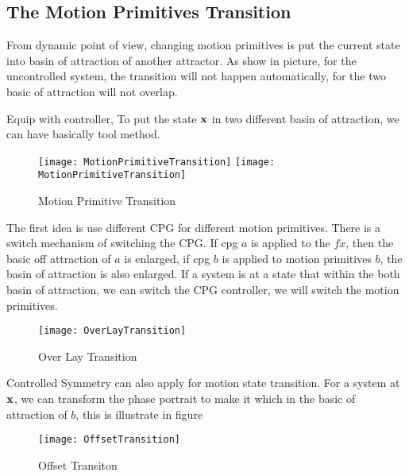 \subsection{The Motion Primitives Transition}

From dynamic point of view, changing motion primitives is put the current state into basin of attraction of another attractor.
As show in picture, for the uncontrolled system, the transition will not happen automatically, for the two basic of attraction will not overlap.

Equip with controller,
To put the state $\mathbf{x}$ in two different basin of attraction, we can have basically tool method.


\begin{figure}[!htbp]
  \begin{center}
    \leavevmode
    \ifpdf
      \texttt{[image: MotionPrimitiveTransition]}
    \else
      \texttt{[image: MotionPrimitiveTransition]}
    \fi
    \caption{Motion Primitive Transition}
    \label{fig:motion-transition}
  \end{center}
\end{figure}

\begin{itemize}
The first idea is use different CPG for different motion primitives. 
There is a switch mechanism of switching the CPG.
If cpg $a$ is applied to the $fx$, then the basic off attraction of $a$ is enlarged, if cpg $b$ is applied to motion primitives $b$,
the basin of attraction is also enlarged.
If a system is at a state that within the both basin of attraction, we can switch the CPG controller, we will switch the motion primitives.


\begin{figure}[!htbp]
  \begin{center}
      \texttt{[image: OverLayTransition]}
    \caption{Over Lay Transition}
    \label{fig:motion-transition}
  \end{center}
\end{figure}


Controlled Symmetry can also apply for motion state transition.
For a system at $\mathbf{x}$, we can transform the phase portrait to make it which in the basic of attraction of $b$,
this is illustrate in figure 


\begin{figure}[!htbp]
  \begin{center}
      \texttt{[image: OffsetTransition]}
    \caption{Offset Transiton}
    \label{fig:transform-transit}
  \end{center}
\end{figure}
\end{itemize}




